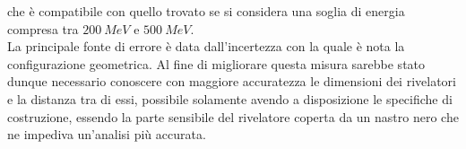 \documentclass[11pt]{article}
\begin{document}
\begin{flushleft}
che è compatibile con quello trovato se si considera una soglia di energia compresa tra $200 \ MeV$ e $500 \ MeV$. \\
La principale fonte di errore è data dall'incertezza con la quale è nota la configurazione geometrica. Al fine di migliorare questa misura sarebbe stato dunque necessario conoscere con maggiore accuratezza le dimensioni dei rivelatori e la distanza tra di essi, possibile solamente avendo a disposizione le specifiche di costruzione, essendo la parte sensibile del rivelatore coperta da un nastro nero che ne impediva un'analisi più accurata. 
\end{flushleft}

\end{document}
